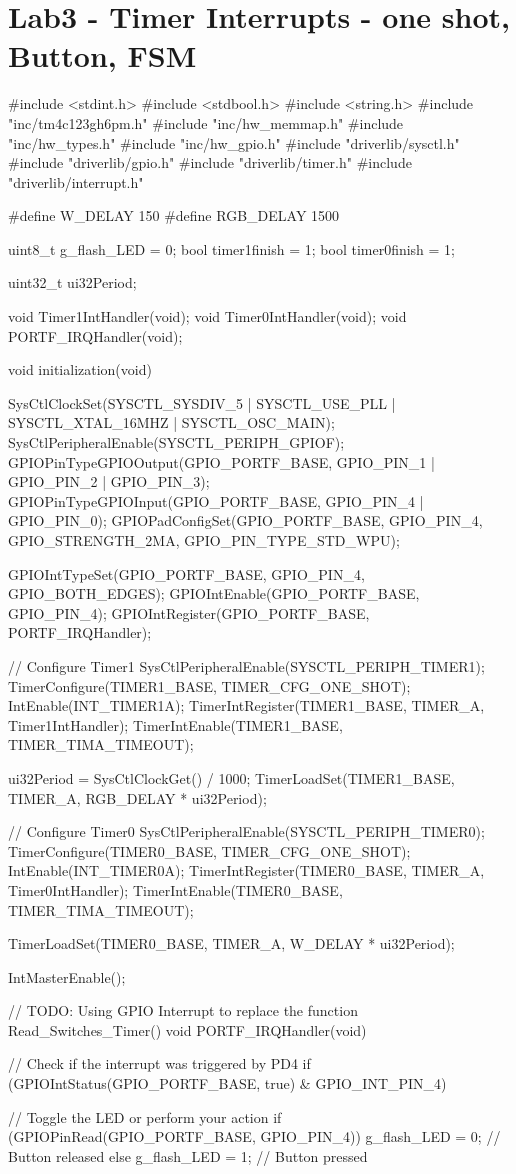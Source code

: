 \documentclass[12pt, a4paper]{article}
\begin{document}
\section{Lab3 - Timer Interrupts - one shot, Button, FSM}
\begin{code}
#include <stdint.h>
#include <stdbool.h>
#include <string.h>
#include "inc/tm4c123gh6pm.h"
#include "inc/hw_memmap.h"
#include "inc/hw_types.h"
#include "inc/hw_gpio.h"
#include "driverlib/sysctl.h"
#include "driverlib/gpio.h"
#include "driverlib/timer.h"
#include "driverlib/interrupt.h"

#define W_DELAY 150
#define RGB_DELAY 1500

uint8_t g_flash_LED = 0;
bool timer1finish = 1;
bool timer0finish = 1;

uint32_t ui32Period;

void Timer1IntHandler(void);
void Timer0IntHandler(void);
void PORTF_IRQHandler(void);

void initialization(void)
{
    SysCtlClockSet(SYSCTL_SYSDIV_5 | SYSCTL_USE_PLL | SYSCTL_XTAL_16MHZ | SYSCTL_OSC_MAIN);
    SysCtlPeripheralEnable(SYSCTL_PERIPH_GPIOF);
    GPIOPinTypeGPIOOutput(GPIO_PORTF_BASE, GPIO_PIN_1 | GPIO_PIN_2 | GPIO_PIN_3);
    GPIOPinTypeGPIOInput(GPIO_PORTF_BASE, GPIO_PIN_4 | GPIO_PIN_0);
    GPIOPadConfigSet(GPIO_PORTF_BASE, GPIO_PIN_4, GPIO_STRENGTH_2MA, GPIO_PIN_TYPE_STD_WPU);

    GPIOIntTypeSet(GPIO_PORTF_BASE, GPIO_PIN_4, GPIO_BOTH_EDGES);
    GPIOIntEnable(GPIO_PORTF_BASE, GPIO_PIN_4);
    GPIOIntRegister(GPIO_PORTF_BASE, PORTF_IRQHandler);

    // Configure Timer1
    SysCtlPeripheralEnable(SYSCTL_PERIPH_TIMER1);
    TimerConfigure(TIMER1_BASE, TIMER_CFG_ONE_SHOT);
    IntEnable(INT_TIMER1A);
    TimerIntRegister(TIMER1_BASE, TIMER_A, Timer1IntHandler);
    TimerIntEnable(TIMER1_BASE, TIMER_TIMA_TIMEOUT);

    ui32Period = SysCtlClockGet() / 1000;
    TimerLoadSet(TIMER1_BASE, TIMER_A, RGB_DELAY * ui32Period);

    // Configure Timer0
    SysCtlPeripheralEnable(SYSCTL_PERIPH_TIMER0);
    TimerConfigure(TIMER0_BASE, TIMER_CFG_ONE_SHOT);
    IntEnable(INT_TIMER0A);
    TimerIntRegister(TIMER0_BASE, TIMER_A, Timer0IntHandler);
    TimerIntEnable(TIMER0_BASE, TIMER_TIMA_TIMEOUT);

    TimerLoadSet(TIMER0_BASE, TIMER_A, W_DELAY * ui32Period);

    IntMasterEnable();
}

// TODO: Using GPIO Interrupt to replace the function Read_Switches_Timer()
void PORTF_IRQHandler(void)
{
    // Check if the interrupt was triggered by PD4
    if (GPIOIntStatus(GPIO_PORTF_BASE, true) & GPIO_INT_PIN_4)
    {
        // Toggle the LED or perform your action
        if (GPIOPinRead(GPIO_PORTF_BASE, GPIO_PIN_4))
            g_flash_LED = 0; // Button released
        else
            g_flash_LED = 1; // Button pressed

}}
\end{code}
\end{document}
